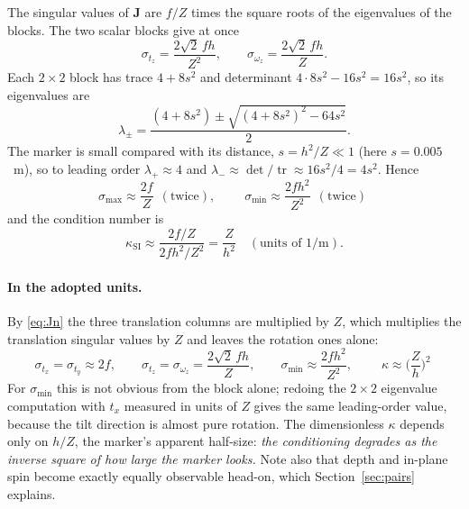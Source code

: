 \documentclass[11pt,a4paper]{article}
\theoremstyle{remark}
\newcommand{\Jmat}{\mathbf{J}}
\begin{document}
The singular values of $\Jmat$ are $f/Z$ times the square roots of the
eigenvalues of the blocks. The two scalar blocks give at once
\begin{equation}
  \sigma_{t_z} = \frac{2\sqrt2\,f h}{Z^2},
  \qquad
  \sigma_{\omega_z} = \frac{2\sqrt2\,f h}{Z}.
\end{equation}
Each $2\times2$ block has trace $4 + 8s^2$ and determinant
$4\cdot8s^2 - 16s^2 = 16s^2$, so its eigenvalues are
\begin{equation}
  \lambda_\pm = \frac{(4+8s^2) \pm \sqrt{(4+8s^2)^2 - 64s^2}}{2}.
\end{equation}
The marker is small compared with its distance, $s = h^2/Z \ll 1$ (here
$s = 0.005$~m), so to leading order $\lambda_+ \approx 4$ and
$\lambda_- \approx \det/\operatorname{tr} \approx 16s^2/4 = 4s^2$. Hence
\begin{equation}
  \sigma_{\max} \approx \frac{2f}{Z}
  \ \ (\text{twice}),
  \qquad
  \boxed{\;\sigma_{\min} \approx \frac{2 f h^2}{Z^2}
  \ \ (\text{twice})\;}
  \label{eq:sigmas}
\end{equation}
and the condition number is
\begin{equation}
  \kappa_{\mathrm{SI}} \approx \frac{2f/Z}{2fh^2/Z^2} = \frac{Z}{h^2}
  \quad(\text{units of } 1/\mathrm{m}).
  \label{eq:kappa}
\end{equation}
\paragraph{In the adopted units.} By \eqref{eq:Jn} the three translation columns
are multiplied by $Z$, which multiplies the translation singular values by $Z$
and leaves the rotation ones alone:
\begin{equation}
  \sigma_{t_x} = \sigma_{t_y} \approx 2f,
  \qquad
  \sigma_{t_z} = \sigma_{\omega_z} = \frac{2\sqrt2\,f h}{Z},
  \qquad
  \sigma_{\min} \approx \frac{2 f h^2}{Z^2},
  \qquad
  \boxed{\;\kappa \approx \Big(\frac{Z}{h}\Big)^2\;}
  \label{eq:sigmasn}
\end{equation}
For $\sigma_{\min}$ this is not obvious from the block alone; redoing the
$2\times2$ eigenvalue computation with $t_x$ measured in units of $Z$ gives the
same leading-order value, because the tilt direction is almost pure rotation.
The dimensionless $\kappa$ depends only on $h/Z$, the marker's apparent
half-size: \emph{the conditioning degrades as the inverse square of how large
the marker looks.} Note also that depth and in-plane spin become exactly equally
observable head-on, which Section~\ref{sec:pairs} explains.
\end{document}
